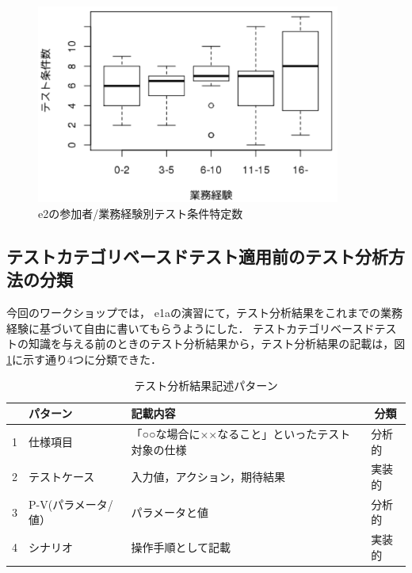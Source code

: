 \begin{figure}[htbp]
  \begin{center}
  \includegraphics[width=10cm]{./image/D-3-Fig16.png}
  \caption{e2の参加者/業務経験別テスト条件特定数}
  \label{fig:D-3-Fig16}
  \end{center}
   \end{figure}


\subsection{テストカテゴリベースドテスト適用前のテスト分析方法の分類}
今回のワークショップでは， e1aの演習にて，テスト分析結果をこれまでの業務経験に基づいて自由に書いてもらうようにした．
テストカテゴリベースドテストの知識を与える前のときのテスト分析結果から，テスト分析結果の記載は，図\ref{tab:D-3-tab11}に示す通り4つに分類できた．
\begin{table}[htbp]

  \centering
  \caption{テスト分析結果記述パターン}
    \begin{tabular}{|c|p{9em}|p{14em}|p{3em}|}
    \hline
          & パターン & 記載内容 & \multicolumn{1}{c|}{分類} \bigstrut\\
    \hline
    \hline
    1     & 仕様項目  & 「○○な場合に××なること」といったテスト対象の仕様 & 分析的 \bigstrut\\
    \hline
    2     & テストケース & 入力値，アクション，期待結果 & 実装的 \bigstrut\\
    \hline
    3     & P-V(パラメータ/値） & パラメータと値 & 分析的 \bigstrut[t]\\
    \hline
    4     & シナリオ  & 操作手順として記載 & 実装的 \bigstrut[b]\\
    \hline
    \end{tabular}%
  \label{tab:D-3-tab11}%
\end{table}%

